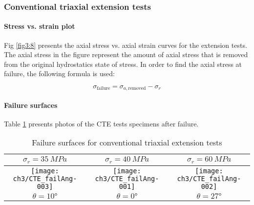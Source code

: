 \subsubsection{Conventional triaxial extension tests}

\paragraph{Stress vs. strain plot}

Fig \ref{fig3:8} presents the axial stress vs. axial strain curves for the extension tests. The axial stress in the figure represent the amount of axial stress that is removed from the original hydrostatics state of stress. In order to find the axial stress at failure, the following formula is used: 

\begin{equation}
    \sigma_\text{failure} = \sigma_{a,\text{removed}} - \sigma_r
\end{equation}

\paragraph{Failure surfaces}

Table \ref{tb3:photoCTE} presents photos of the CTE tests specimens after failure. 


\begin{table}
    \centering
    \begin{tabular}{|c|c|c|}
     \hline
     $\sigma_r = \SI{35}{MPa}$ & $\sigma_r = \SI{40}{MPa}$ &  $\sigma_r = \SI{60}{MPa}$ \\
     \hline
     \texttt{[image: ch3/CTE\_failAng-003]} & 
     \texttt{[image: ch3/CTE\_failAng-001]} &
     \texttt{[image: ch3/CTE\_failAng-002]} \\
     \hline
     $\theta = \ang{10}$ & $\theta = \ang{0}$  &  $\theta = \ang{27}$ \\
     \hline
    \end{tabular}
    \caption{Failure surfaces for conventional triaxial extension tests}
    \label{tb3:photoCTE}
\end{table}

